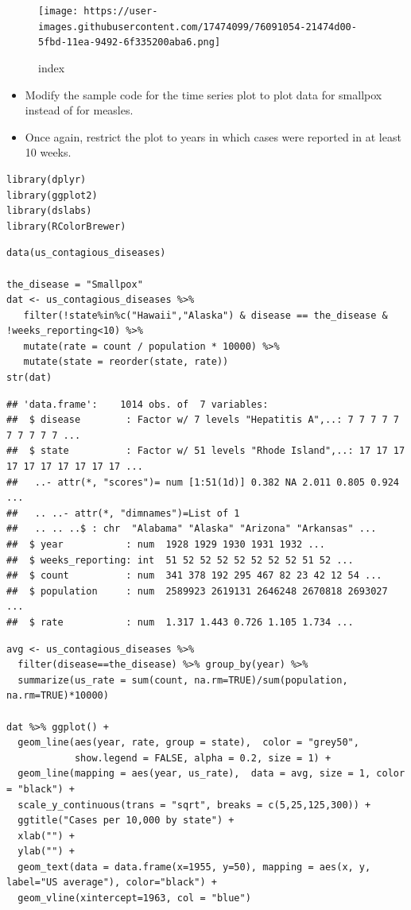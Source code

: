 \documentclass[
]{article}
\providecommand{\tightlist}{%
  \setlength{\itemsep}{0pt}\setlength{\parskip}{0pt}}
\begin{document}
\begin{figure}
\centering
\texttt{[image: https://user-images.githubusercontent.com/17474099/76091054-21474d00-5fbd-11ea-9492-6f335200aba6.png]}
\caption{index}
\end{figure}

\begin{itemize}
\tightlist
\item
  Modify the sample code for the time series plot to plot data for
  smallpox instead of for measles.
\item
  Once again, restrict the plot to years in which cases were reported in
  at least 10 weeks.
\end{itemize}

\begin{verbatim}
library(dplyr)
library(ggplot2)
library(dslabs)
library(RColorBrewer)
\end{verbatim}

\begin{verbatim}
data(us_contagious_diseases)

the_disease = "Smallpox"
dat <- us_contagious_diseases %>%
   filter(!state%in%c("Hawaii","Alaska") & disease == the_disease & !weeks_reporting<10) %>%
   mutate(rate = count / population * 10000) %>%
   mutate(state = reorder(state, rate))
str(dat)
\end{verbatim}

\begin{verbatim}
## 'data.frame':    1014 obs. of  7 variables:
##  $ disease        : Factor w/ 7 levels "Hepatitis A",..: 7 7 7 7 7 7 7 7 7 7 ...
##  $ state          : Factor w/ 51 levels "Rhode Island",..: 17 17 17 17 17 17 17 17 17 17 ...
##   ..- attr(*, "scores")= num [1:51(1d)] 0.382 NA 2.011 0.805 0.924 ...
##   .. ..- attr(*, "dimnames")=List of 1
##   .. .. ..$ : chr  "Alabama" "Alaska" "Arizona" "Arkansas" ...
##  $ year           : num  1928 1929 1930 1931 1932 ...
##  $ weeks_reporting: int  51 52 52 52 52 52 52 52 51 52 ...
##  $ count          : num  341 378 192 295 467 82 23 42 12 54 ...
##  $ population     : num  2589923 2619131 2646248 2670818 2693027 ...
##  $ rate           : num  1.317 1.443 0.726 1.105 1.734 ...
\end{verbatim}

\begin{verbatim}
avg <- us_contagious_diseases %>%
  filter(disease==the_disease) %>% group_by(year) %>%
  summarize(us_rate = sum(count, na.rm=TRUE)/sum(population, na.rm=TRUE)*10000)

dat %>% ggplot() +
  geom_line(aes(year, rate, group = state),  color = "grey50", 
            show.legend = FALSE, alpha = 0.2, size = 1) +
  geom_line(mapping = aes(year, us_rate),  data = avg, size = 1, color = "black") +
  scale_y_continuous(trans = "sqrt", breaks = c(5,25,125,300)) + 
  ggtitle("Cases per 10,000 by state") + 
  xlab("") + 
  ylab("") +
  geom_text(data = data.frame(x=1955, y=50), mapping = aes(x, y, label="US average"), color="black") + 
  geom_vline(xintercept=1963, col = "blue")
\end{verbatim}
\end{document}
